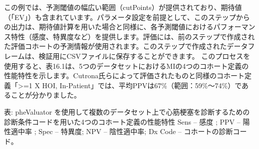 \documentclass[
  11pt]{book}
\theoremstyle{definition}
\theoremstyle{definition}
\theoremstyle{definition}
\theoremstyle{definition}
\theoremstyle{remark}
\begin{document}
この例では、予測閾値の幅広い範囲（cutPoints）が提供されており、期待値（「EV」）も含まれています。パラメータ設定を前提として、このステップからの出力は、期待値計算を用いた場合と同様に、各予測閾値におけるパフォーマンス特性（感度、特異度など）を提供します。評価には、前のステップで作成された評価コホートの予測情報が使用されます。このステップで作成されたデータフレームは、検証用にCSVファイルに保存することができます。 このプロセスを使用すると、表16.1は、5つのデータセットにおけるMIの4つのコホート定義の性能特性を示します。Cutrona氏らによって評価されたものと同様のコホート定義「\textgreater=1 X HOI, In-Patient」では、平均PPVは67\%（範囲：59\%～74\%）であることが分かりました。

表: \label{tab:phevalStats} pheValuator を使用して複数のデータセット上で心筋梗塞を診断するための診断条件コードを用いた4つのコホート定義の性能特性 Sens -- 感度 ; PPV -- 陽性適中率 ; Spec -- 特異度; NPV -- 陰性適中率; Dx Code -- コホートの診断コード。
\end{document}
